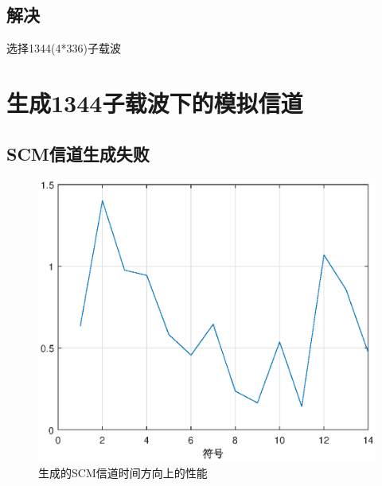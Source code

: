 \documentclass{article}
\begin{document}
\subsection{解决}
选择1344(4*336)子载波

\section{生成1344子载波下的模拟信道}
\subsection{SCM信道生成失败}
\begin{figure}[H]
	\centering
	\includegraphics[width = .7\textwidth]{old.eps}
	\caption{生成的SCM信道时间方向上的性能}
\end{figure}
\end{document}
